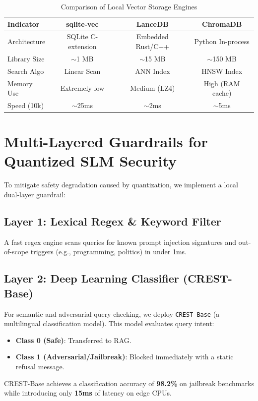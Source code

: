 \documentclass[journal,compsoc]{IEEEtran}
\begin{document}
\begin{table}[h]
\centering
\caption{Comparison of Local Vector Storage Engines}
\label{tab:vectordb}
\begin{tabular}{lccc}
\toprule
\textbf{Indicator} & \textbf{sqlite-vec} & \textbf{LanceDB} & \textbf{ChromaDB} \\
\midrule
Architecture & SQLite C-extension & Embedded Rust/C++ & Python In-process \\
Library Size & $\sim$1 MB & $\sim$15 MB & $\sim$150 MB \\
Search Algo & Linear Scan & ANN Index & HNSW Index \\
Memory Use & Extremely low & Medium (LZ4) & High (RAM cache) \\
Speed (10k) & $\sim$25ms & $\sim$2ms & $\sim$5ms \\
\bottomrule
\end{tabular}
\end{table}

\section{Multi-Layered Guardrails for Quantized SLM Security}
To mitigate safety degradation caused by quantization, we implement a local dual-layer guardrail:

\subsection{Layer 1: Lexical Regex \& Keyword Filter}
A fast regex engine scans queries for known prompt injection signatures and out-of-scope triggers (e.g., programming, politics) in under 1ms.

\subsection{Layer 2: Deep Learning Classifier (CREST-Base)}
For semantic and adversarial query checking, we deploy \texttt{CREST-Base} (a multilingual classification model). This model evaluates query intent:
\begin{itemize}
\item \textbf{Class 0 (Safe)}: Transferred to RAG.
\item \textbf{Class 1 (Adversarial/Jailbreak)}: Blocked immediately with a static refusal message.
\end{itemize}

CREST-Base achieves a classification accuracy of \textbf{98.2\%} on jailbreak benchmarks while introducing only \textbf{15ms} of latency on edge CPUs.
\end{document}
